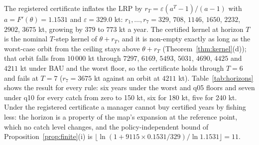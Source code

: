 \documentclass[11pt,a4paper]{article}
\theoremstyle{plain}
\theoremstyle{definition}
\theoremstyle{remark}
\newcommand{\LRP}{\theta}
\begin{document}
The registered certificate inflates the LRP by $r_T=\varepsilon(a^{T}-1)/(a-1)$ with $a=F'(\LRP)=1.1531$ and $\varepsilon=329.0$ kt: $r_1,\dots,r_7=329$, $708$, $1146$, $1650$, $2232$, $2902$, $3675$ kt, growing by $379$ to $773$ kt a year. The certified kernel at horizon $T$ is the nominal $T$-step kernel of $\LRP+r_T$, and it is non-empty exactly as long as the worst-case orbit from the ceiling stays above $\LRP+r_T$ (Theorem~\ref{thm:kernel}(d)); that orbit falls from $10\,000$ kt through $7297$, $6169$, $5493$, $5031$, $4690$, $4425$ and $4211$ kt under BAU and the worst floor, so the certificate holds through $T=6$ and fails at $T=7$ ($r_7=3675$ kt against an orbit at $4211$ kt). Table~\ref{tab:horizons} shows the result for every rule: six years under the worst and q05 floors and seven under q10 for every catch from zero to 150 kt, six for 180 kt, five for 240 kt. Under the registered certificate a manager cannot buy certified years by fishing less: the horizon is a property of the map's expansion at the reference point, which no catch level changes, and the policy-independent bound of Proposition~\ref{prop:finite}(i) is $\lfloor\ln(1+9115\times0.1531/329)/\ln1.1531\rfloor=11$.
\end{document}
